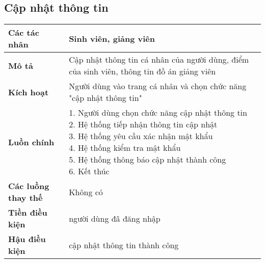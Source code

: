 \subsection*{Cập nhật thông tin}
	\begin{tabular}{|l|p{}|}
		\hline
		\textbf{Các tác nhân}         & Sinh viên, giảng viên                                                              \\
		\hline
		\textbf{Mô tả}                & Cập nhật thông tin cá nhân của người dùng, điểm của sinh viên, thông tin đồ án giảng viên \\
		\hline
		\textbf{Kích hoạt}            & Người dùng vào trang cá nhân và chọn chức năng "cập nhật thông tin"                       \\
		\hline
		\textbf{Luồn chính}           & \makecell[l]{1. Người dùng chọn chức năng cập nhật thông tin                              \\ 2. Hệ thống tiếp nhận thông tin cập nhật \\ 3. Hệ thống yêu cầu xác nhận mật khẩu \\ 4. Hệ thống kiểm tra mật khẩu \\ 5. Hệ thống thông báo cập nhật thành công \\ 6. Kết thúc} \\
		\hline
		\textbf{Các luồng thay thế}   & Không có                                                                                  \\
		\hline
		\textbf{Tiền điều kiện}       & người dùng đã đăng nhập                                                                   \\
		\hline
		\textbf{Hậu điều kiện}        & cập nhật thông tin thành công                                                             \\
		\hline
	\end{tabular}

